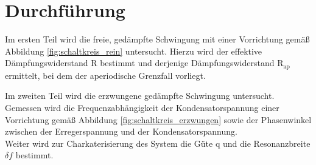 \section{Durchführung}
\label{sec:Durchfuehrung}

Im ersten Teil wird die freie, gedämpfte Schwingung mit einer Vorrichtung gemäß Abbildung \ref{fig:schaltkreis_rein} untersucht.
Hierzu wird der effektive Dämpfungswiderstand R bestimmt und derjenige Dämpfungswiderstand $\mathup{R}_\mathup{ap}$ ermittelt, bei dem der aperiodische Grenzfall vorliegt.

Im zweiten Teil wird die erzwungene gedämpfte Schwingung untersucht.
Gemessen wird die Frequenzabhängigkeit der Kondensatorspannung einer Vorrichtung gemäß Abbildung \ref{fig:schaltkreis_erzwungen} sowie der Phasenwinkel zwischen der Erregerspannung und der Kondensatorspannung.\\
Weiter wird zur Charkaterisierung des System die Güte q und die Resonanzbreite $\delta f$ bestimmt.




